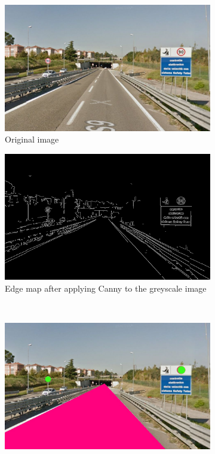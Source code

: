 \documentclass[twoside,onecolumn]{article}
\theoremstyle{definition}
\begin{document}
  
\begin{figure} \centering
\begin{subfigure}{0.45\textwidth}
  \includegraphics[width=\textwidth]{../images/road3.jpg}
\caption{ Original image}\label{fig:r3fig}
\end{subfigure} \quad
\begin{subfigure}{0.45\textwidth}
\includegraphics[width=\textwidth]{../results/edgeMap_road3.jpg}
\caption{Edge map after applying Canny to the greyscale image}\label{fig:r3edges}
\end{subfigure}\\
  \begin{subfigure}{0.6\textwidth}
\includegraphics[width=\textwidth]{../results/Circles_road3.jpg}

\end{subfigure}
\end{figure}
\end{document}
